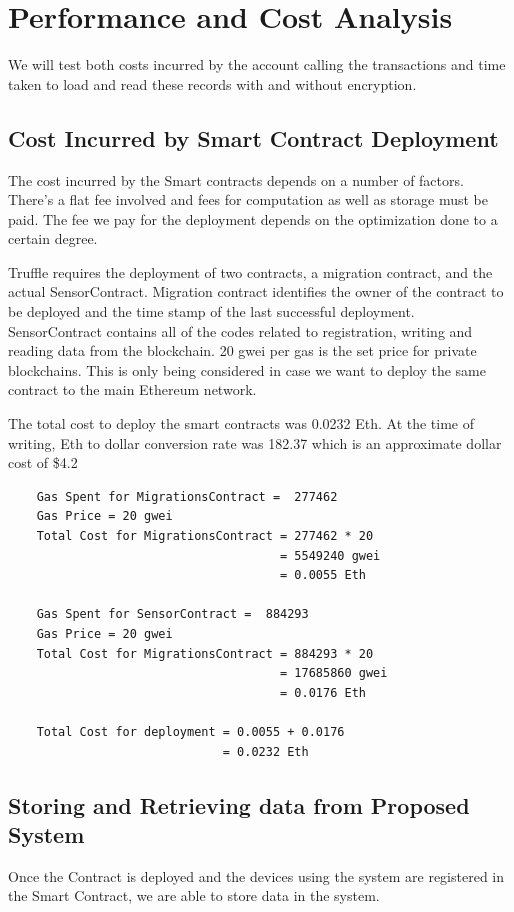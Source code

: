 \documentclass[11pt,openright]{report}
\begin{document}
\chapter{Performance and Cost Analysis}
\label{chapter:experiment_results}
We will test both costs incurred by the account calling the transactions and time taken to load and read these records with and without encryption.

\section{Cost Incurred by Smart Contract Deployment}
The cost incurred by the Smart contracts depends on a number of factors. There's a flat fee involved and fees for computation as well as storage must be paid. The fee we pay for the deployment depends on the optimization done to a certain degree. 

Truffle requires the deployment of two contracts, a migration contract, and the actual SensorContract. Migration contract identifies the owner of the contract to be deployed and the time stamp of the last successful deployment. SensorContract contains all of the codes related to registration, writing and reading data from the blockchain. 20 gwei per gas is the set price for private blockchains. This is only being considered in case we want to deploy the same contract to the main Ethereum network.

The total cost to deploy the smart contracts was 0.0232 Eth. At the time of writing, Eth to dollar conversion rate was 182.37 which is an approximate dollar cost of \$4.2

\begin{verbatim}
    Gas Spent for MigrationsContract =  277462
    Gas Price = 20 gwei
    Total Cost for MigrationsContract = 277462 * 20
                                      = 5549240 gwei
                                      = 0.0055 Eth
    
    Gas Spent for SensorContract =  884293
    Gas Price = 20 gwei
    Total Cost for MigrationsContract = 884293 * 20
                                      = 17685860 gwei
                                      = 0.0176 Eth                           
    
    Total Cost for deployment = 0.0055 + 0.0176
                              = 0.0232 Eth
\end{verbatim}


\section{Storing and Retrieving data from Proposed System}
Once the Contract is deployed and the devices using the system are registered in the Smart Contract, we are able to store data in the system.
\end{document}
